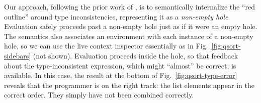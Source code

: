 Our approach, following the prior work of \citet{popl-paper}, 
is to semantically internalize the ``red outline'' around
type inconsistencies, representing it as a \emph{non-empty hole}.
Evaluation safely proceeds past a non-empty hole just as if it were an empty hole.
The semantics also associates an environment with each instance of a non-empty hole,
so we can use the live context inspector essentially as in Fig.~\ref{fig:qsort-sidebars} (not shown). 
Evaluation proceeds inside the hole, so that 
feedback about the type-inconsistent expression, which might ``almost'' be correct, is available. 
In this case, the result at the bottom of Fig.~\ref{fig:qsort-type-error}
reveals that the programmer is on the right track: the list elements 
appear in the correct order.
They simply have not been combined correctly.

